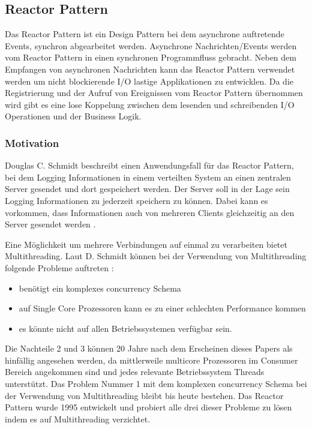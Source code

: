 \subsection{Reactor Pattern}
\label{section:Reactor Pattern}

Das Reactor Pattern ist ein Design Pattern bei dem asynchrone auftretende Events, synchron abgearbeitet werden. Asynchrone Nachrichten/Events werden vom Reactor Pattern in einen synchronen Programmfluss gebracht. Neben dem Empfangen von asynchronen Nachrichten kann das Reactor Pattern verwendet werden um nicht blockierende I/O lastige Applikationen zu entwicklen. Da die Registrierung und der Aufruf von Ereignissen vom Reactor Pattern übernommen wird gibt es eine lose Koppelung zwischen dem lesenden und schreibenden I/O Operationen und der Business Logik. \cite[p. 1]{Sch95}

\subsubsection{Motivation}
\label{section:reactor_motivation}

Douglas C. Schmidt beschreibt einen Anwendungsfall für das Reactor Pattern, bei dem Logging Informationen in einem verteilten System an einen zentralen Server gesendet und dort gespeichert werden. Der Server soll in der Lage sein Logging Informationen zu jederzeit speichern zu können. Dabei kann es vorkommen, dass Informationen auch von mehreren Clients gleichzeitig an den Server gesendet werden \cite[p. 1]{Sch95}. 

Eine Möglichkeit um mehrere Verbindungen auf einmal zu verarbeiten bietet Multithreading. Laut D. Schmidt können bei der Verwendung von Multithreading folgende Probleme auftreten \cite[p. 1]{Sch95}: 

\begin{itemize}
  \item benötigt ein komplexes concurrency Schema
  \item auf Single Core Prozessoren kann es zu einer schlechten Performance kommen
  \item es könnte nicht auf allen Betriebssystemen verfügbar sein.
\end{itemize}

Die Nachteile 2 und 3 können 20 Jahre nach dem Erscheinen dieses Papers als hinfällig angesehen werden, da mittlerweile multicore Prozessoren im Consumer Bereich angekommen sind und jedes relevante Betriebssystem Threads unterstützt. Das Problem Nummer 1 mit dem komplexen concurrency Schema bei der Verwendung von Multithreading bleibt bis heute bestehen. Das Reactor Pattern wurde 1995 entwickelt und probiert alle drei dieser Probleme zu lösen indem es auf Multithreading verzichtet.

